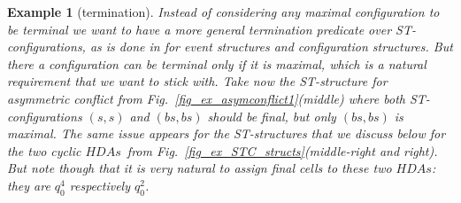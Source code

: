 \documentclass[submission,copyright,creativecommons]{eptcs}
\newtheorem{example}[theorem]{Example}
\newcommand\HDAs{\ensuremath{\mathit{HDAs}}}
\begin{document}
\begin{example}[termination]\label{ex_termination}
Instead of considering any maximal configuration to be terminal we want to have a more general \textit{termination predicate} over ST-configurations, as is done in \cite[Def.4.1\&Def.5.1]{GlabbeekG01refinement} for event structures and configuration structures. But there a configuration can be terminal only if it is maximal, which is a natural requirement that we want to stick with.
Take now the ST-structure for asymmetric conflict from Fig.~\ref{fig_ex_asymconflict1}(middle) where both ST-configurations $(s,s)$ and $(bs,bs)$ should be final, but only $(bs,bs)$ is maximal. The same issue appears for the ST-structures that we discuss below for the two cyclic \HDAs\ from Fig.~\ref{fig_ex_STC_structs}(middle-right and right). But note though that it is very natural to assign \textit{final cells} to these two \HDAs: they are $q_{0}^{4}$ respectively $q_{0}^{2}$.


\end{example}
\end{document}
